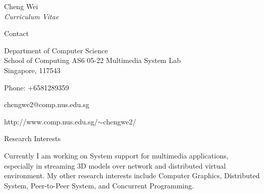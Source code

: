 \documentclass[10pt]{article}
\begin{document}


\newlength{\oldcvlabelwidth}
\renewcommand*{\cvbibname}{}

\begin{cv}{Cheng Wei\\{\large \itshape Curriculum Vitae}}

\begin{cvlist}{Contact}
	\item
	Department of Computer Science\\
	School of Computing
        AS6 05-22 Multimedia System Lab\\
        Singapore, 117543
	\item Phone: +6581289359
	\item chengwe2@comp.nus.edu.sg
	\item http://www.comp.nus.edu.sg/$\sim$chengwe2/
\end{cvlist}

\begin{cvlist}{Research Interests}
	\item Currently I am working on System support for multimedia applications,
              especially in streaming 3D models over network and distributed virtual environment.
              My other research interests include Computer Graphics, Distributed System,
              Peer-to-Peer System, and Concurrent Programming.
\end{cvlist}


\end{cv}
\end{document}
